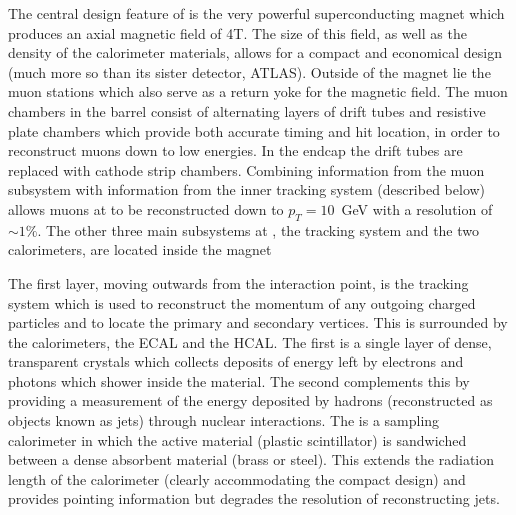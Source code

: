 The central design feature of \CMS is the very powerful superconducting magnet which produces an axial magnetic field of 4T. The size of this field, as well as the density of the calorimeter materials, allows for a compact and economical design (much more so than its sister detector, ATLAS). Outside of the magnet lie the muon stations which also serve as a return yoke for the magnetic field. The muon chambers in the barrel consist of alternating layers of drift tubes and resistive plate chambers which provide both accurate timing and hit location, in order to reconstruct muons down to low energies. In the endcap the drift tubes are replaced with cathode strip chambers. Combining information from the muon subsystem with information from the inner tracking system (described below) allows muons at \CMS to be reconstructed down to $p_{T}=10$~GeV with a resolution of $\sim1\%$. The other three main subsystems at \CMS, the tracking system and the two calorimeters, are located inside the magnet

The first layer, moving outwards from the interaction point, is the tracking system which is used to reconstruct the momentum of any outgoing charged particles and to locate the primary and secondary vertices. This is surrounded by the calorimeters, the \acf{ECAL} and the \acf{HCAL}. The first is a single layer of dense, transparent crystals which collects deposits of energy left by electrons and photons which shower inside the material. The second complements this by providing a measurement of the energy deposited by hadrons (reconstructed as objects known as jets) through nuclear interactions. The \HCAL is a sampling calorimeter in which the active material (plastic scintillator) is sandwiched between a dense absorbent material (brass or steel). This extends the radiation length of the calorimeter (clearly accommodating the compact design) and provides pointing information but degrades the resolution of reconstructing jets. 

